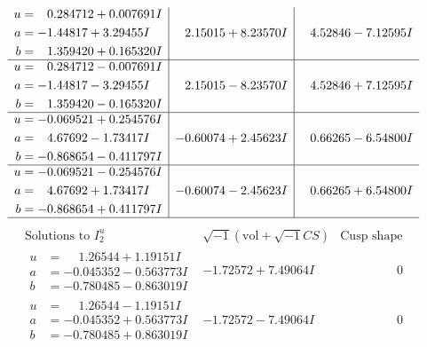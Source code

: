 \documentclass[1p]{elsarticle_modified}
\theoremstyle{definition}
\newcommand{\I}{\sqrt{-1}}
\begin{document}
$$\begin{array}{c|c|c}
\begin{aligned}
u &= \phantom{-}0.284712 + 0.007691 I \\
a &= -1.44817 + 3.29455 I \\
b &= \phantom{-}1.359420 + 0.165320 I\end{aligned}
 & \phantom{-}2.15015 + 8.23570 I & \phantom{-}4.52846 - 7.12595 I \\ \hline\begin{aligned}
u &= \phantom{-}0.284712 - 0.007691 I \\
a &= -1.44817 - 3.29455 I \\
b &= \phantom{-}1.359420 - 0.165320 I\end{aligned}
 & \phantom{-}2.15015 - 8.23570 I & \phantom{-}4.52846 + 7.12595 I \\ \hline\begin{aligned}
u &= -0.069521 + 0.254576 I \\
a &= \phantom{-}4.67692 - 1.73417 I \\
b &= -0.868654 - 0.411797 I\end{aligned}
 & -0.60074 + 2.45623 I & \phantom{-}0.66265 - 6.54800 I \\ \hline\begin{aligned}
u &= -0.069521 - 0.254576 I \\
a &= \phantom{-}4.67692 + 1.73417 I \\
b &= -0.868654 + 0.411797 I\end{aligned}
 & -0.60074 - 2.45623 I & \phantom{-}0.66265 + 6.54800 I\\
 \hline 
 \end{array}$$\newpage$$\begin{array}{c|c|c}  
\text{Solutions to }I^u_{2}& \I (\text{vol} + \sqrt{-1}CS) & \text{Cusp shape}\\
 \hline 
\begin{aligned}
u &= \phantom{-}1.26544 + 1.19151 I \\
a &= -0.045352 - 0.563773 I \\
b &= -0.780485 - 0.863019 I\end{aligned}
 & -1.72572 + 7.49064 I & \phantom{-0.000000 } 0 \\ \hline\begin{aligned}
u &= \phantom{-}1.26544 - 1.19151 I \\
a &= -0.045352 + 0.563773 I \\
b &= -0.780485 + 0.863019 I\end{aligned}
 & -1.72572 - 7.49064 I & \phantom{-0.000000 } 0 \\ \hline\begin{aligned}

\end{aligned}
\end{array}$$
\end{document}
